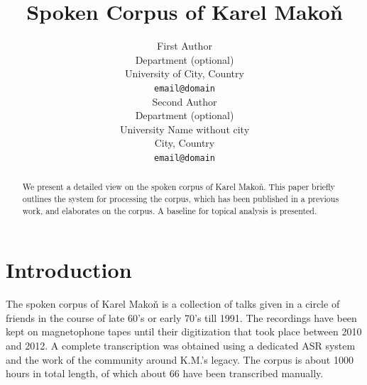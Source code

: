 \documentclass[a4paper,11pt]{article}
\title{Spoken Corpus of Karel Mako\v{n}}
\author{First Author \\
  Department (optional)\\
  University of City, Country \\
  {\tt email@domain} \\\And %
  Second Author \\
  Department (optional)\\
  University Name without city \\
  City, Country \\
 {\tt email@domain} \\
}
\date{}
\begin{document}
\maketitle
\begin{abstract}
  We present a detailed view on the spoken corpus of Karel Mako\v{n}. This paper
  briefly outlines the system for processing the corpus, which has been
  published in a previous work, and elaborates on the corpus. A baseline for
  topical analysis is presented.
\end{abstract}

\section{Introduction} \label{intro}

%

The spoken corpus of Karel Mako\v{n} is a collection of talks given in a circle
of friends in the course of late 60's or early 70's till 1991. The recordings
have been kept on magnetophone tapes until their digitization that took place
between 2010 and 2012. A complete transcription was obtained using a dedicated
ASR system and the work of the community around K.M.'s legacy. The corpus is
about 1000 hours in total length, of which about 66 have been transcribed
manually.
\end{document}
